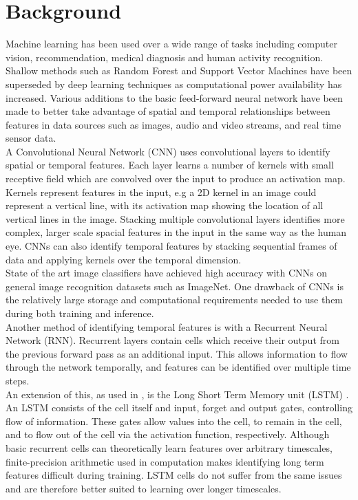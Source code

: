 \chapter{Background}

Machine learning has been used over a wide range of tasks including computer vision, recommendation, medical diagnosis and human activity recognition. Shallow methods such as Random Forest and Support Vector Machines have been superseded by deep learning techniques as computational power availability has increased. Various additions to the basic feed-forward neural network have been made to better take advantage of spatial and temporal relationships between features in data sources such as images, audio and video streams, and real time sensor data.\\

A Convolutional Neural Network (CNN) \cite{Neocognitron} uses convolutional layers to identify spatial or temporal features. Each layer learns a number of kernels with small receptive field which are convolved over the input to produce an activation map. Kernels represent features in the input, e.g a 2D kernel in an image could represent a vertical line, with its activation map showing the location of all vertical lines in the image. Stacking multiple convolutional layers identifies more complex, larger scale spacial features in the input in the same way as the human eye. CNNs can also identify temporal features by stacking sequential frames of data and applying kernels over the temporal dimension.\\

State of the art image classifiers have achieved high accuracy with CNNs on general image recognition datasets such as ImageNet. One drawback of CNNs is the relatively large storage and computational requirements needed to use them during both training and inference.\\

Another method of identifying temporal features is with a Recurrent Neural Network (RNN). Recurrent layers contain cells which receive their output from the previous forward pass as an additional input. This allows information to flow through the network temporally, and features can be identified over multiple time steps.\\

An extension of this, as used in \cite{DeepConvLSTM}, is the Long Short Term Memory unit (LSTM) \cite{LSTM}. An LSTM consists of the cell itself and input, forget and output gates, controlling flow of information. These gates allow values into the cell, to remain in the cell, and to flow out of the cell via the activation function, respectively. Although basic recurrent cells can theoretically learn features over arbitrary timescales, finite-precision arithmetic used in computation makes identifying long term features difficult during training. LSTM cells do not suffer from the same issues and are therefore better suited to learning over longer timescales.\\


